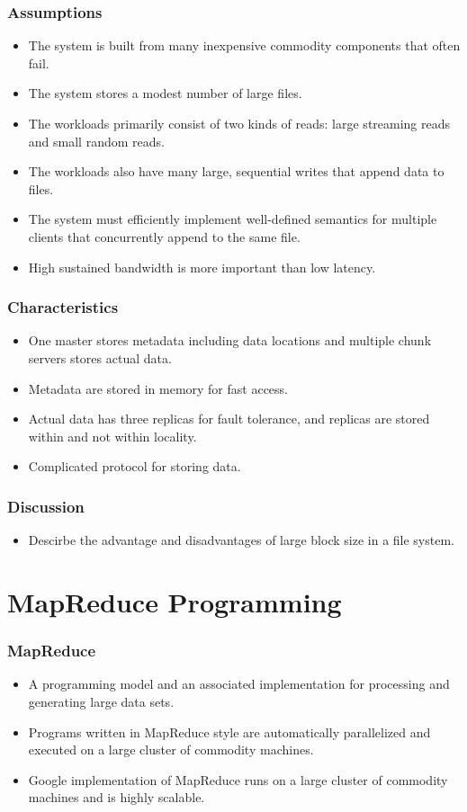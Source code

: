 \documentclass{beamer}
\begin{document}
\begin{frame}
  \frametitle{Assumptions}
  \begin{itemize}
    \item The system is built from many inexpensive commodity
      components that often fail.
    \item The system stores a modest number of large files.
    \item The workloads primarily consist of two kinds of reads: large
      streaming reads and small random reads.
    \item The workloads also have many large, sequential writes that
      append data to files.
    \item The system must efficiently implement well-defined semantics
      for multiple clients that concurrently append to the same file.
    \item High sustained bandwidth is more important than low latency.
  \end{itemize}
\end{frame}

\begin{frame}
  \frametitle{Characteristics}
  \begin{itemize}
    \item One master stores metadata including data locations and
      multiple chunk servers stores actual data.
    \item Metadata are stored in memory for fast access.
    \item Actual data has three replicas for fault tolerance, and
      replicas are stored within and not within locality.
    \item Complicated protocol for storing data.
  \end{itemize}
\end{frame}

\begin{frame}
  \frametitle{Discussion}
  \begin{itemize}
    \item Descirbe the advantage and disadvantages of large block size
      in a file system.
  \end{itemize}
\end{frame}

\section{MapReduce Programming}

\begin{frame}
  \frametitle{MapReduce}
  \begin{itemize}
  \item A programming model and an associated implementation for
    processing and generating large data sets.
  \item Programs written in MapReduce style are automatically
    parallelized and executed on a large cluster of commodity
    machines.
  \item Google implementation of MapReduce runs on a large cluster of
    commodity machines and is highly scalable.
  \end{itemize}
\end{frame}
\end{document}
